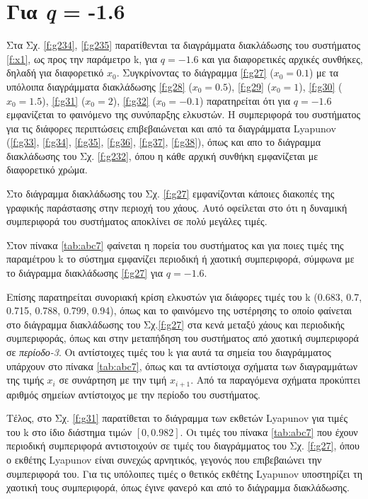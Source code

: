 \clearpage
\section{Για \emph{q} = -1.6}

Στα Σχ. \ref{f:g234}, \ref{f:g235}  παρατίθενται τα διαγράμματα διακλάδωσης του συστήματος \ref{f:x1}, ως προς την παράμετρο k, για  $q =- 1.6$ και για διαφορετικές αρχικές συνθήκες, δηλαδή για διαφορετικό \(x_0\). Συγκρίνοντας το διάγραμμα \ref{f:g27} (\(x_0=0.1\)) με τα υπόλοιπα διαγράμματα διακλάδωσης \ref{f:g28}  (\(x_0=0.5\)), \ref{f:g29}  (\(x_0=1\)), \ref{f:g30}  (\(x_0=1.5\)), \ref{f:g31}  (\(x_0=2\)), \ref{f:g32}  (\(x_0=-0.1\)) παρατηρείται ότι για $q= -1.6$ εμφανίζεται το φαινόμενο της συνύπαρξης ελκυστών. Η συμπεριφορά του συστήματος για τις διάφορες περιπτώσεις επιβεβαιώνεται και από τα διαγράμματα Lyapunov (\ref{f:g33}, \ref{f:g34}, \ref{f:g35}, \ref{f:g36}, \ref{f:g37}, \ref{f:g38}), όπως και απο το διάγραμμα διακλάδωσης του Σχ. \ref{f:g232}, όπου η κάθε αρχική συνθήκη εμφανίζεται με διαφορετικό χρώμα.

Στο διάγραμμα διακλάδωσης του Σχ. \ref{f:g27} εμφανίζονται κάποιες διακοπές της γραφικής παράστασης στην περιοχή του χάους. Αυτό οφείλεται στο ότι η δυναμική συμπεριφορά του συστήματος αποκλίνει σε πολύ μεγάλες τιμές.

Στον πίνακα \ref{tab:abc7} φαίνεται η πορεία του συστήματος και για ποιες τιμές της παραμέτρου  k το σύστημα εμφανίζει περιοδική ή χαοτική συμπεριφορά, σύμφωνα με το διάγραμμα διακλάδωσης \ref{f:g27} για $q=-1.6$.

Επίσης παρατηρείται συνοριακή κρίση ελκυστών για διάφορες τιμές του k (0.683, 0.7, 0.715, 0.788, 0.799, 0.94), όπως και το φαινόμενο της υστέρησης το οποίο φαίνεται στο διάγραμμα διακλάδωσης του Σχ.\ref{f:g27} στα κενά μεταξύ χάους και περιοδικής συμπεριφοράς, όπως και στην μεταπήδηση του συστήματος από χαοτική συμπεριφορά σε \emph{περίοδο-3}. Οι αντίστοιχες τιμές του k για αυτά τα σημεία του διαγράμματος υπάρχουν στο πίνακα \ref{tab:abc7}, όπως και τα αντίστοιχα σχήματα των διαγραμμάτων της τιμής \(x_i\) σε συνάρτηση με την τιμή \(x_{i+1}\). Από τα παραγόμενα σχήματα προκύπτει αριθμός σημείων αντίστοιχος με την περίοδο του συστήματος.

Τέλος, στο Σχ. \ref{f:g31} παρατίθεται το διάγραμμα των εκθετών Lyapunov για τιμές του k στο ίδιο διάστημα τιμών $[0, 0.982]$. Οι τιμές του πίνακα \ref{tab:abc7} που έχουν περιοδική συμπεριφορά αντιστοιχούν σε τιμές του διαγράμματος του Σχ. \ref{f:g27}, όπου ο εκθέτης Lyapunov είναι συνεχώς αρνητικός, γεγονός που επιβεβαιώνει την συμπεριφορά του. Για τις υπόλοιπες τιμές ο θετικός εκθέτης Lyapunov υποστηρίζει τη χαοτική τους συμπεριφορά, όπως έγινε φανερό και από το διάγραμμα διακλάδωσης.\\\\


